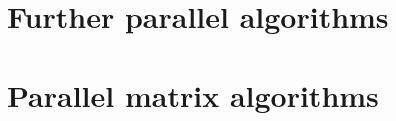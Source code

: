 \documentclass[11pt,a4paper]{article}
\theoremstyle{definition}
\begin{document}
\section{Further parallel algorithms}

\section{Parallel matrix algorithms}
\end{document}
